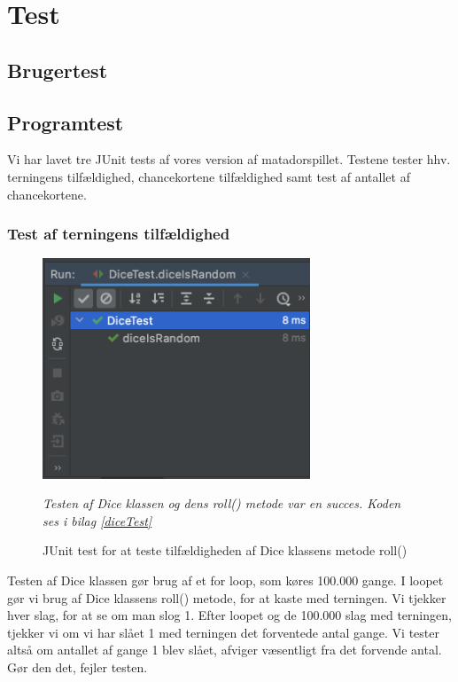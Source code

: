 \section{Test}





\subsection{Brugertest}

\subsection{Programtest}
Vi har lavet tre JUnit tests af vores version af matadorspillet. Testene tester hhv. terningens tilfældighed, chancekortene tilfældighed samt test af antallet af chancekortene.

\subsubsection{Test af terningens tilfældighed}
    \begin{figure}[H]
        \centering
        \includegraphics[width=8cm]{figures/diceIsRandomTest.png}
        \caption{JUnit test for at teste tilfældigheden af Dice klassens metode roll()}
        \emph{Testen af Dice klassen og dens roll() metode var en succes. Koden ses i bilag \ref{diceTest}}
    \end{figure}
    Testen af Dice klassen gør brug af et for loop, som køres 100.000 gange. I loopet gør vi brug af Dice klassens roll() metode, for at kaste med terningen. Vi tjekker hver slag, for at se om man slog 1. Efter loopet og de 100.000 slag med terningen, tjekker vi om vi har slået 1 med terningen det forventede antal gange. Vi tester altså om antallet af gange 1 blev slået, afviger væsentligt fra det forvende antal. Gør den det, fejler testen.
    


